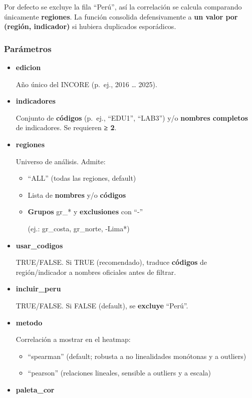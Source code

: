 \documentclass[
  11pt,
  letterpaper,
  DIV=11,
  numbers=noendperiod]{scrartcl}
\begin{document}
Por defecto se excluye la fila ``Perú'', así la correlación se calcula
comparando únicamente \textbf{regiones}. La función consolida
defensivamente a \textbf{un valor por (región, indicador)} si hubiera
duplicados esporádicos.

\subsubsection{\texorpdfstring{\textbf{Parámetros}}{Parámetros}}\label{paruxe1metros-13}

\begin{itemize}
\item
  \textbf{edicion}

  Año único del INCORE (p.~ej., 2016 \ldots{} 2025).
\item
  \textbf{indicadores}

  Conjunto de \textbf{códigos} (p.~ej., ``EDU1'', ``LAB3'') y/o
  \textbf{nombres completos} de indicadores. Se requieren \textbf{≥ 2}.
\item
  \textbf{regiones}

  Universo de análisis. Admite:

  \begin{itemize}
  \item
    ``ALL'' (todas las regiones, default)
  \item
    Lista de \textbf{nombres} y/o \textbf{códigos}
  \item
    \textbf{Grupos} gr\_* y \textbf{exclusiones} con ``-''

    (ej.: gr\_costa, gr\_norte, -Lima*)
  \end{itemize}
\item
  \textbf{usar\_codigos}

  TRUE/FALSE. Si TRUE (recomendado), traduce \textbf{códigos} de
  región/indicador a nombres oficiales antes de filtrar.
\item
  \textbf{incluir\_peru}

  TRUE/FALSE. Si FALSE (default), se \textbf{excluye} ``Perú''.
\item
  \textbf{metodo}

  Correlación a mostrar en el heatmap:

  \begin{itemize}
  \item
    ``spearman'' (default; robusta a no linealidades monótonas y a
    outliers)
  \item
    ``pearson'' (relaciones lineales, sensible a outliers y a escala)
  \end{itemize}
\item
  \textbf{paleta\_cor}


\end{itemize}
\end{document}
